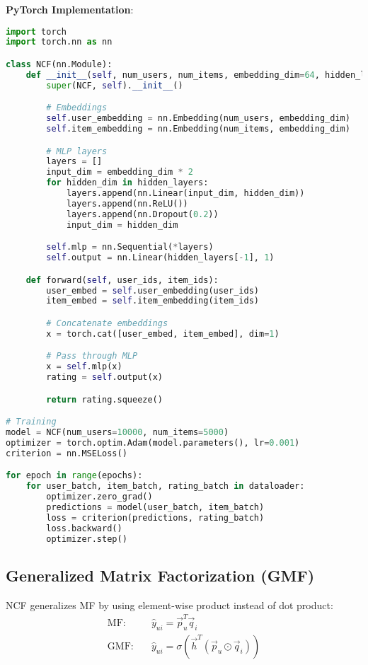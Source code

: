 \documentclass[10pt]{article}
\begin{document}
\textbf{PyTorch Implementation}:
\begin{lstlisting}[language=Python]
import torch
import torch.nn as nn

class NCF(nn.Module):
    def __init__(self, num_users, num_items, embedding_dim=64, hidden_layers=[128, 64, 32]):
        super(NCF, self).__init__()

        # Embeddings
        self.user_embedding = nn.Embedding(num_users, embedding_dim)
        self.item_embedding = nn.Embedding(num_items, embedding_dim)

        # MLP layers
        layers = []
        input_dim = embedding_dim * 2
        for hidden_dim in hidden_layers:
            layers.append(nn.Linear(input_dim, hidden_dim))
            layers.append(nn.ReLU())
            layers.append(nn.Dropout(0.2))
            input_dim = hidden_dim

        self.mlp = nn.Sequential(*layers)
        self.output = nn.Linear(hidden_layers[-1], 1)

    def forward(self, user_ids, item_ids):
        user_embed = self.user_embedding(user_ids)
        item_embed = self.item_embedding(item_ids)

        # Concatenate embeddings
        x = torch.cat([user_embed, item_embed], dim=1)

        # Pass through MLP
        x = self.mlp(x)
        rating = self.output(x)

        return rating.squeeze()

# Training
model = NCF(num_users=10000, num_items=5000)
optimizer = torch.optim.Adam(model.parameters(), lr=0.001)
criterion = nn.MSELoss()

for epoch in range(epochs):
    for user_batch, item_batch, rating_batch in dataloader:
        optimizer.zero_grad()
        predictions = model(user_batch, item_batch)
        loss = criterion(predictions, rating_batch)
        loss.backward()
        optimizer.step()
\end{lstlisting}

\subsection{Generalized Matrix Factorization (GMF)}

NCF generalizes MF by using element-wise product instead of dot product:
\begin{align*}
\text{MF}: \quad &\hat{y}_{ui} = \vec{p}_u^T \vec{q}_i \\
\text{GMF}: \quad &\hat{y}_{ui} = \sigma(\vec{h}^T (\vec{p}_u \odot \vec{q}_i))
\end{align*}
\end{document}
